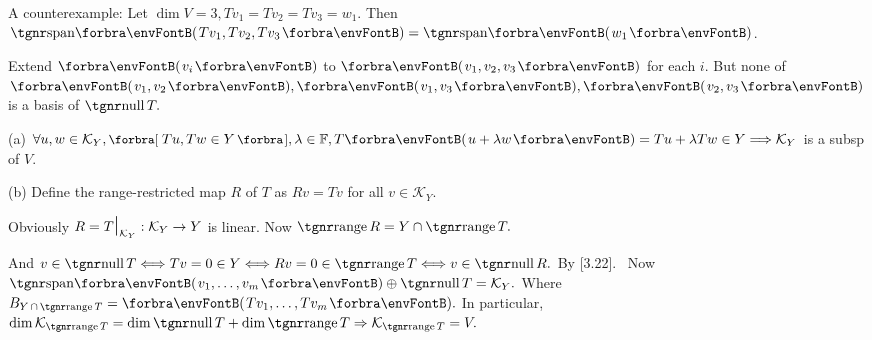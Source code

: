 
\par\quad
A counterexample: Let $\dim V=3, Tv_1=Tv_2=Tv_3=w_1.$ Then $\Span{Tv_1,Tv_2,Tv_3}=\Span{w_1}$.\par\quad
Extend $\Par{v_i}$ to $\Par{v_1,v_2,v_3}$ for each $i$. But none of $\Par{v_1,v_2},\Par{v_1,v_3},\Par{v_2,v_3}$ is a basis of $\null T.$\PfEnd
\SepLine

\par\quad
(a) $\forall u,w\in\mathcal{K}_Y,\Sbra{\,Tu,Tw\in Y\,},\lambda\in\Fbb,T\Par{u+\lambda w}=Tu+\lambda Tw\in Y\Longrightarrow \mathcal{K}_Y$ is a subsp of $V$.\par{\vspace{2pt}}\quad
(b) Define the range-restricted map $R$ of $T$ as $Rv=Tv$ for all $v\in\mathcal{K}_Y.$\par\quad{\Hb}
Obviously $R=T\text{\Large|}_{\mathcal{K}_Y}:\mathcal{K}_Y\rightarrow Y$ is linear. Now $\range R=Y\cap \range T.$\par\quad{\Hb}
And $v\in\null T\Longleftrightarrow Tv=0\in Y\Longleftrightarrow Rv=0\in\range T\Longleftrightarrow v\in\null R.$ By [3.22].\PfEnd\vspace{4pt}
\Comment \,\,\,Now $\Span{v_1,\dots,v_m}\oplus\null T=\mathcal{K}_Y.$ {Where $B_{Y\,\cap\,\range T}=\Par{Tv_1,\dots,Tv_m}.$}\vspace{0pt}\parCom
In particular, $\dim\mathcal{K}_{\range T}=\dim\null T+\dim\range T\Rightarrow\mathcal{K}_{\range T}=V.$
\SepLine


